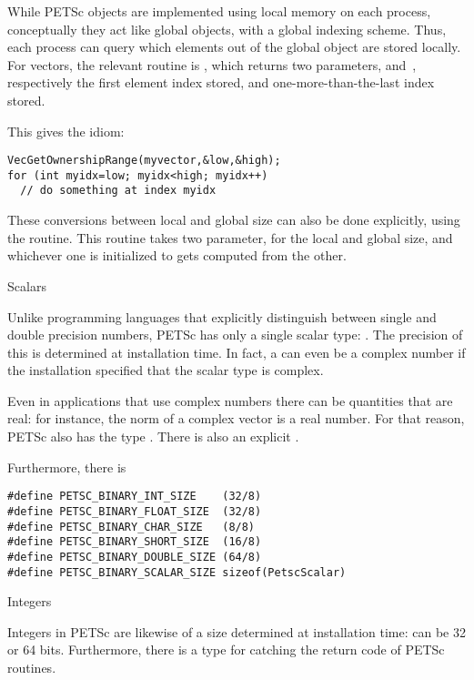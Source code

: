 
While PETSc objects are implemented using local memory on each
process, conceptually they act like global objects, with a global
indexing scheme. Thus, each process can query which elements out of
the global object are stored locally.
For vectors, the relevant routine is ,
which returns two parameters,  and~,
respectively the first element index stored, and
one-more-than-the-last index stored.

This gives the idiom:
\begin{lstlisting}
VecGetOwnershipRange(myvector,&low,&high);
for (int myidx=low; myidx<high; myidx++)
  // do something at index myidx
\end{lstlisting}

These conversions between local and global size can also be done
explicitly, using the  routine.
This routine takes two parameter, for the local and global size, and
whichever one is initialized to  gets
computed from the other.

 {Scalars}
\label{sec:petsc-scalar}

Unlike programming languages that explicitly distinguish between
single and double precision numbers, PETSc has only a single scalar
type: . The precision of this is determined
at installation time. In fact, a  can even be a
complex number if the installation specified that the scalar type is
complex.

Even in applications that use complex numbers there can be quantities
that are real: for instance, the norm of a complex vector is a real
number. For that reason, PETSc also has the type
. There is also an explicit .

Furthermore, there is
\begin{lstlisting}
#define PETSC_BINARY_INT_SIZE    (32/8)
#define PETSC_BINARY_FLOAT_SIZE  (32/8)
#define PETSC_BINARY_CHAR_SIZE   (8/8)
#define PETSC_BINARY_SHORT_SIZE  (16/8)
#define PETSC_BINARY_DOUBLE_SIZE (64/8)
#define PETSC_BINARY_SCALAR_SIZE sizeof(PetscScalar)  
\end{lstlisting}

 {Integers}

Integers in PETSc are likewise of a size determined at installation
time:  can be 32 or 64 bits. Furthermore,
there is a  type for catching the return
code of PETSc routines.

